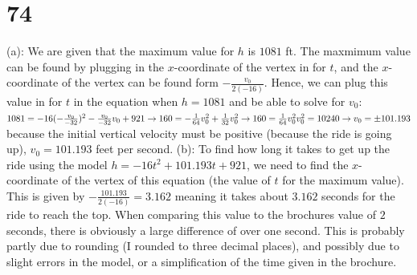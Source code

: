 \documentclass{article}
\theoremstyle{definition}
\begin{document}
\section*{74}
(a): We are given that the maximum value for $h$ is $1081$ ft. The maxmimum value can be found by plugging in the $x$-coordinate of the vertex in 
for $t$, and the $x$-coordinate of the vertex can be found form $-\frac{v_0}{2(-16)}$. Hence, we can plug this value in for $t$ in the equation when 
$h=1081$ and be able to solve for $v_0$:\newline 
$1081=-16(-\frac{v_0}{-32})^2-\frac{v_0}{-32}v_0+921\newline\rightarrow 
160=-\frac{1}{64}v_0^2+\frac{1}{32}v_0^2\newline\rightarrow 
160=\frac{1}{64}v_0^2
v_0^2=10240\newline\rightarrow 
v_0=\pm 101.193$\newline because the initial vertical velocity must be positive (because the ride is going up), $v_0=101.193$ feet per second.\newline
(b): To find how long it takes to get up the ride using the model $h=-16t^2+101.193t+921$, we need to find the $x$-coordinate of the vertex of this 
equation (the value of $t$ for the maximum value). This is given by $-\frac{101.193}{2(-16)}=3.162$ meaning it takes about $3.162$ seconds for the 
ride to reach the top. When comparing this value to the brochures value of $2$ seconds, there is obviously a large difference of over one second. This is 
probably partly due to rounding (I rounded to three decimal places), and possibly due to slight errors in the model, or a simplification of the time 
given in the brochure.



 
\end{document}
